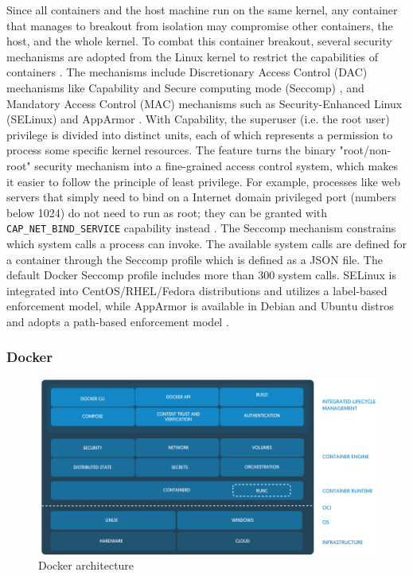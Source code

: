 \documentclass[english, 12pt, a4paper, sci, utf8, a-2b, online]{aaltothesis}
\begin{document}
Since all containers and the host machine run on the same kernel, any container that manages to breakout from isolation may compromise other containers, the host, and the whole kernel.
To combat this container breakout, several security mechanisms are adopted from the Linux kernel to restrict the capabilities of containers \cite{lin2018measurement}.
The mechanisms include Discretionary Access Control (DAC) mechanisms like Capability \cite{manpages-capabilities} and Secure computing mode (Seccomp) \cite{manpages-seccomp}, and Mandatory Access Control (MAC) mechanisms such as Security-Enhanced Linux (SELinux) and AppArmor \cite{apparmor}.
With Capability, the superuser (i.e. the root user) privilege is divided into distinct units, each of which represents a permission to process some specific kernel resources.
The feature turns the binary "root/non-root" security mechanism into a fine-grained access control system, which makes it easier to follow the principle of least privilege.
For example, processes like web servers that simply need to bind on a Internet domain privileged port (numbers below 1024) do not need to run as root; they can be granted with \texttt{CAP\_NET\_BIND\_SERVICE} capability instead \cite{docker-security}.
The Seccomp mechanism constrains which system calls a process can invoke.
The available system calls are defined for a container through the Seccomp profile which is defined as a JSON file.
The default Docker Seccomp profile \cite{docker-default-seccomp} includes more than 300 system calls.
SELinux is integrated into CentOS/RHEL/Fedora distributions and utilizes a label-based enforcement model, while AppArmor is available in Debian and Ubuntu distros and adopts a path-based enforcement model \cite{lin2018measurement}.

\subsubsection{Docker}

\begin{figure}[h!]
  \centering
  \includegraphics[width=\linewidth]{files/docker-arch.jpeg}
  \caption{Docker architecture \cite{containerd}}
  \label{figure-docker}
\end{figure}
\end{document}
